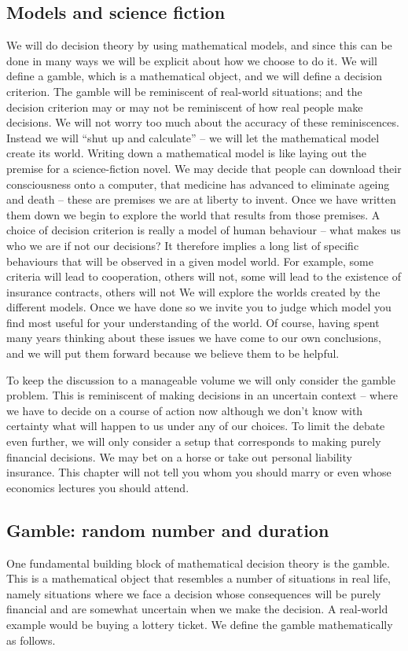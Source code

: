 \subsection{Models and science fiction}
We will do decision theory 
by using mathematical models, and since this can be done in many ways we will be
explicit about how we choose to do it. We will define a gamble, which 
is a mathematical object, and we will define a decision criterion. The gamble will be
reminiscent of real-world situations; and the decision criterion may or may not be reminiscent
of how real people make decisions. We will not worry too much about the accuracy 
of these reminiscences. Instead we will ``shut up and calculate'' -- we will let the mathematical
model create its world. Writing down a mathematical model is like laying out the premise for
a science-fiction novel. We may decide that people can download their consciousness onto a computer, 
that medicine has advanced to eliminate ageing and death -- these are premises we are at liberty to invent.
Once we have written them down we begin to explore the world that results from those premises.
A choice of decision criterion is really a model of human behaviour -- what makes us who we are if not our decisions? It therefore implies a long list of specific behaviours that will
be observed in a given model world. For example, some criteria will lead to cooperation, others will not, some will lead
to the existence of insurance contracts, others will not \etc We will explore the worlds created by the different
models. Once we have done so we invite you to judge which model you find most useful
for your understanding of the world. Of course, having spent many years thinking about these
issues we have come to our own conclusions, and we will put them forward because we believe them to be helpful.

To keep the discussion to a manageable volume we will only consider the gamble problem. 
This is reminiscent of making decisions in an uncertain context -- where we have to decide on
a course of action now although we don't know with certainty what will happen to us under any
of our choices. To limit the debate even further, we will only consider a setup that corresponds to
making purely financial decisions. We may bet on a horse or take out personal liability insurance.
This chapter will not tell you whom you should marry or even whose economics lectures you should attend.

\subsection{Gamble: random number and duration}
One fundamental building block of mathematical decision theory is the gamble.
This is a mathematical object that resembles a number of situations in real life, 
namely situations where we face a decision whose consequences will be purely
financial and are somewhat uncertain when we make the decision. A real-world example would be buying a lottery ticket. We define the gamble mathematically as follows.

